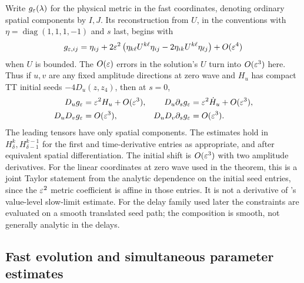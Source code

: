 Write \(g_\varepsilon(\lambda)\) for the physical metric in the fast coordinates, denoting ordinary spatial components by \(I,J\). Its reconstruction from \(U\), in the conventions with \(\eta=\operatorname{diag}(1,1,1,-1)\) and \(s\) last, begins with
\[
 g_{\varepsilon,ij}=\eta_{ij}
  +2\varepsilon^2\left(\eta_{k\ell}U^{k\ell}\eta_{ij}
                     -2\eta_{ik}U^{k\ell}\eta_{\ell j}\right)
  +O(\varepsilon^4)
\]
when \(U\) is bounded. The \(O(\varepsilon)\) errors in the solution's \(U\) turn into \(O(\varepsilon^3)\) here. Thus if \(u,v\) are any fixed amplitude directions at zero wave and \(H_u\) has compact TT initial seeds \(-4D_u(z,z_4)\), then at \(s=0\),
\begin{align}
   D_u g_\varepsilon&=\varepsilon^2 H_u+O(\varepsilon^3),&
   D_u \partial_s g_\varepsilon&=\varepsilon^2\dot H_u+O(\varepsilon^3),\label{eq:initfirst}\\
   D_uD_v g_\varepsilon&=O(\varepsilon^3),&
   D_uD_v\partial_s g_\varepsilon&=O(\varepsilon^3).\label{eq:initsecond}
\end{align}
The leading tensors have only spatial components. The estimates hold in \(H^k_\delta,H^{k-1}_{\delta-1}\) for the first and time-derivative entries as appropriate, and after equivalent spatial differentiation. The initial shift is \(O(\varepsilon^3)\) with two amplitude derivatives. For the linear coordinates at zero wave used in the theorem, this is a joint Taylor statement from the analytic dependence on the initial seed entries, since the \(\varepsilon^2\) metric coefficient is affine in those entries. It is not a derivative of \cite[Thm.~1.1]{Oliynyk}'s value-level slow-limit estimate. For the delay family used later the constraints are evaluated on a smooth translated seed path; the composition is smooth, not generally analytic in the delays.

\subsection{Fast evolution and simultaneous parameter estimates}

